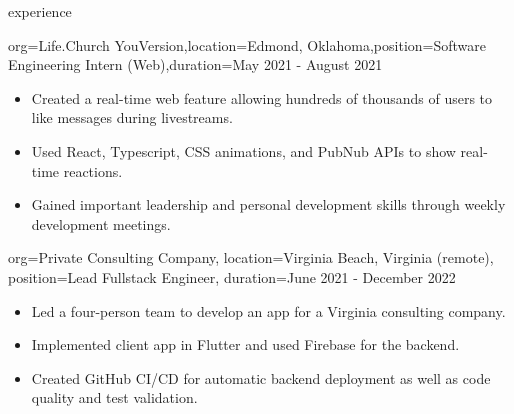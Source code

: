 \documentclass{resume}
\begin{document}
\begin{ResumeSection}{experience}
    \begin{ResumeSubsection}{org={Life.Church YouVersion},location={Edmond,
        Oklahoma},position={Software Engineering Intern (Web)},duration={May 2021 - August 2021}}
        \begin{itemize}
            \item {Created a real-time web feature allowing hundreds of thousands of
                users to like messages during livestreams.}
            \item {Used React, Typescript, CSS animations, and PubNub APIs to
                show real-time reactions.}
            \item Gained important leadership and personal development skills
                through weekly development meetings.
        \end{itemize}
    \end{ResumeSubsection}

    \begin{ResumeSubsection}{
            org={Private Consulting Company},
            location={Virginia Beach, Virginia (remote)},
            position={Lead Fullstack Engineer},
            duration={June 2021 - December 2022}
        }
        \begin{itemize}
            \item {Led a four-person team to develop an app for a Virginia consulting company.}
            \item {Implemented client app in Flutter and used Firebase for the backend.}
            \item {Created GitHub CI/CD for automatic backend deployment as well as code quality and test validation.}
        \end{itemize}
    \end{ResumeSubsection}



\end{ResumeSection}
\end{document}
